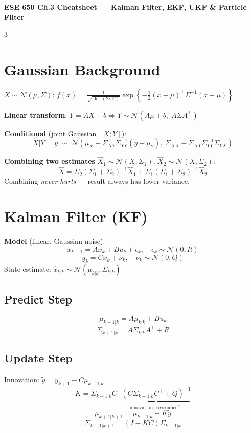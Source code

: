 \documentclass[9pt,landscape]{article}
\begin{document}
\begin{center}
  {\normalsize\bfseries ESE 650 Ch.3 Cheatsheet --- Kalman Filter, EKF, UKF \& Particle Filter}
\end{center}
\vspace{-4pt}
\begin{multicols}{3}

\section{Gaussian Background}

$X\sim\mathcal{N}(\mu,\Sigma)$: $f(x)=\frac{1}{\sqrt{\det(2\pi\Sigma)}}\exp\!\left\{-\tfrac{1}{2}(x-\mu)^\top\Sigma^{-1}(x-\mu)\right\}$

\textbf{Linear transform}: $Y=AX+b \Rightarrow Y\sim\mathcal{N}(A\mu+b,\;A\Sigma A^\top)$

\textbf{Conditional} (joint Gaussian $[X;Y]$):
\[X|Y=y\;\sim\;\mathcal{N}\!\left(\mu_X+\Sigma_{XY}\Sigma_{YY}^{-1}(y-\mu_Y),\;\Sigma_{XX}-\Sigma_{XY}\Sigma_{YY}^{-1}\Sigma_{YX}\right)\]

\textbf{Combining two estimates} $\hat X_1\sim\mathcal{N}(X,\Sigma_1)$, $\hat X_2\sim\mathcal{N}(X,\Sigma_2)$:
\[\hat X = \Sigma_2(\Sigma_1+\Sigma_2)^{-1}\hat X_1+\Sigma_1(\Sigma_1+\Sigma_2)^{-1}\hat X_2\]
Combining \emph{never hurts} --- result always has lower variance.

\section{Kalman Filter (KF)}

\textbf{Model} (linear, Gaussian noise):
\[x_{k+1}=Ax_k+Bu_k+\epsilon_k,\quad \epsilon_k\sim\mathcal{N}(0,R)\]
\[y_k=Cx_k+\nu_k,\quad \nu_k\sim\mathcal{N}(0,Q)\]
State estimate: $\hat x_{k|k}\sim\mathcal{N}(\mu_{k|k},\Sigma_{k|k})$

\subsection{Predict Step}
\[\mu_{k+1|k}=A\mu_{k|k}+Bu_k\]
\[\Sigma_{k+1|k}=A\Sigma_{k|k}A^\top+R\]

\subsection{Update Step}
Innovation: $\tilde y=y_{k+1}-C\mu_{k+1|k}$
\[K=\Sigma_{k+1|k}C^\top\!\underbrace{(C\Sigma_{k+1|k}C^\top+Q)^{-1}}_{\text{innovation covariance}^{-1}}\]
\[\mu_{k+1|k+1}=\mu_{k+1|k}+K\tilde y\]
\[\Sigma_{k+1|k+1}=(I-KC)\Sigma_{k+1|k}\]


\end{multicols}
\end{document}
